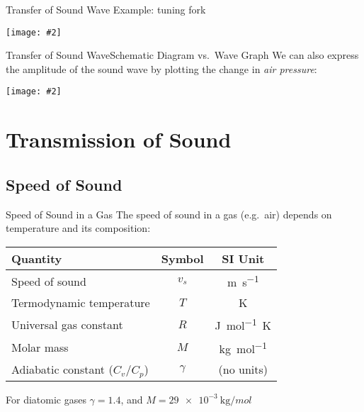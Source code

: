 \documentclass[12pt,compress,aspectratio=169]{beamer}
\newcommand{\pic}[2]{\texttt{[image: \#2]}}
\newcommand{\eq}[2]{\vspace{#1}{\Large\begin{displaymath}#2\end{displaymath}}}
\begin{document}
\begin{frame}{Transfer of Sound Wave}
  Example: tuning fork
  \begin{center}
    \pic{.8}{tuningfork.png}
  \end{center}
\end{frame}



\begin{frame}{Transfer of Sound Wave}{Schematic Diagram vs.\ Wave Graph}
  We can also express the amplitude of the sound wave by plotting the change in
  \emph{air pressure}:

  \vspace{-.2in}
  \begin{center}
    \pic{.9}{schematic-vs-graph.png}
  \end{center}
\end{frame}



\section[Transmission]{Transmission of Sound}

\subsection[$v_s$]{Speed of Sound}

\begin{frame}{Speed of Sound in a Gas}
  The speed of sound in a gas (e.g.\ air) depends on temperature and its
  composition:

  \eq{-.4in}{
    \boxed{v_s=\sqrt{\frac{\gamma RT}{M}}}
  }
  \begin{center}
    \begin{tabular}{l|c|c}
      \rowcolor{pink}
      \textbf{Quantity} & \textbf{Symbol} & \textbf{SI Unit} \\ \hline
      Speed of sound           & $v_s$ & \si{\metre\per\second}\\
      Termodynamic temperature & $T$  & \si{\kelvin}\\
      Universal gas constant   & $R$  & \si{\joule\per mol.\kelvin}\\
      Molar mass               & $M$  & \si{\kilo\gram\per mol}\\
      Adiabatic constant ($C_v/C_p$) & $\gamma$  & (no units)
    \end{tabular}
  \end{center}
  For diatomic gases $\gamma=1.4$, and $M=\SI{29e-3}{\kilo\gram/mol}$
\end{frame}
\end{document}

